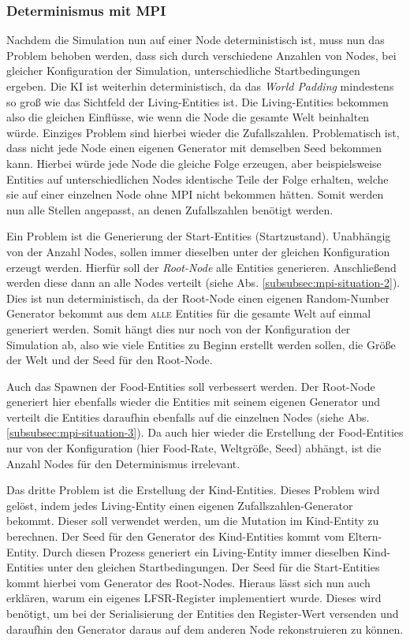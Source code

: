 \documentclass[course=erap]{aspdoc}
\begin{document}
\subsubsection{Determinismus mit MPI}
\label{subsubsec:determinismus-mit-mpi}
Nachdem die Simulation nun auf einer Node deterministisch ist, muss nun das Problem behoben werden, dass sich durch verschiedene Anzahlen von Nodes, bei gleicher Konfiguration der Simulation, unterschiedliche Startbedingungen ergeben. Die KI ist weiterhin deterministisch, da das \emph{World Padding} mindestens so groß wie das Sichtfeld der Living-Entities ist. Die Living-Entities bekommen also die gleichen Einflüsse, wie wenn die Node die gesamte Welt beinhalten würde. Einziges Problem sind hierbei wieder die Zufallszahlen. Problematisch ist, dass nicht jede Node einen eigenen Generator mit demselben Seed bekommen kann. Hierbei würde jede Node die gleiche Folge erzeugen, aber beispielsweise Entities auf unterschiedlichen Nodes identische Teile der Folge erhalten, welche sie auf einer einzelnen Node ohne MPI nicht bekommen hätten. Somit werden nun alle Stellen angepasst, an denen Zufallszahlen benötigt werden.

Ein Problem ist die Generierung der Start-Entities (Startzustand). Unabhängig von der Anzahl Nodes, sollen immer dieselben unter der gleichen Konfiguration erzeugt werden. Hierfür soll der \emph{Root-Node} alle Entities generieren. Anschließend werden diese dann an alle Nodes verteilt (siehe Abs. \ref{subsubsec:mpi-situation-2}). Dies ist nun deterministisch, da der Root-Node einen eigenen Random-Number Generator bekommt aus dem \textsc{alle} Entities für die gesamte Welt auf einmal generiert werden. Somit hängt dies nur noch von der Konfiguration der Simulation ab, also wie viele Entities zu Beginn erstellt werden sollen, die Größe der Welt und der Seed für den Root-Node.

Auch das Spawnen der Food-Entities soll verbessert werden. Der Root-Node generiert hier ebenfalls wieder die Entities mit seinem eigenen Generator und verteilt die Entities daraufhin ebenfalls auf die einzelnen Nodes (siehe Abs. \ref{subsubsec:mpi-situation-3}). Da auch hier wieder die Erstellung der Food-Entities nur von der Konfiguration (hier Food-Rate, Weltgröße, Seed) abhängt, ist die Anzahl Nodes für den Determinismus irrelevant.

Das dritte Problem ist die Erstellung der Kind-Entities. Dieses Problem wird gelöst, indem jedes Living-Entity einen eigenen Zufallszahlen-Generator bekommt. Dieser soll verwendet werden, um die Mutation im Kind-Entity zu berechnen. Der Seed für den Generator des Kind-Entities kommt vom Eltern-Entity. Durch diesen Prozess generiert ein Living-Entity immer dieselben Kind-Entities unter den gleichen Startbedingungen. Der Seed für die Start-Entities kommt hierbei vom Generator des Root-Nodes. Hieraus lässt sich nun auch erklären, warum ein eigenes LFSR-Register implementiert wurde. Dieses wird benötigt, um bei der Serialisierung der Entities den Register-Wert versenden und daraufhin den Generator daraus auf dem anderen Node rekonstruieren zu können.
\end{document}
